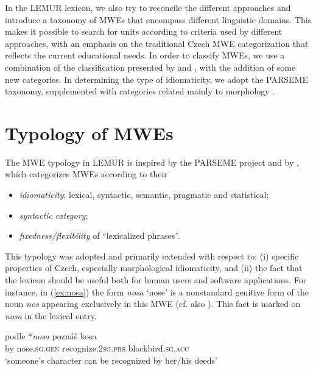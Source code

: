 \documentclass[output=paper,colorlinks,citecolor=brown]{langscibook}
\begin{document}
In the LEMUR lexicon, we also try to reconcile the different approaches and introduce a taxonomy of MWEs that encompass different linguistic domains. This makes it possible to search for units according to criteria used by different approaches, with an emphasis on the traditional Czech MWE categorization that reflects the current educational needs. In order to classify MWEs, we use a combination of the classification presented by \citet{Cermak:2007} and \citet{Moon:2007}, with the addition of some new categories. 
In determining the type of idiomaticity, we adopt the PARSEME taxonomy, supplemented with categories related mainly to morphology \citep{Hnatkova:etal:2017}. 

\section{Typology of MWEs}
\label{sec:typology}

The MWE typology in LEMUR is inspired by the PARSEME project and by  \citet{baldwin2010multiword}, which categorizes MWEs according to their
\begin{itemize} 
\item \textit{idiomaticity}: lexical, syntactic, semantic, pragmatic and statistical;
\item \textit{syntactic category};
\item \textit{fixedness/flexibility} of ``lexicalized phrases''.
\end{itemize}

This typology was adopted and primarily extended with respect to: (i) specific properties of Czech, especially
 morphological idiomaticity, 
and (ii) the fact that the lexicon should be useful both for human users and software applications. For instance, in (\ref{ex:nosa}) the form \emph{nosa} ‘nose’ is a nonstandard genitive form of the noun \emph{nos} appearing exclusively in this MWE (cf. also ). This fact is marked on \emph{nosa} in the lexical entry.

\ea \label{ex:nosa}
\gll podle *\emph{nosa} poznáš kosa\\
     by nose.\textsc{sg.gen} recognize.\textsc{2sg.prs} blackbird.\textsc{sg.acc}\\
\glt `someone’s character can be recognized by her/his deeds'
\z
\end{document}
